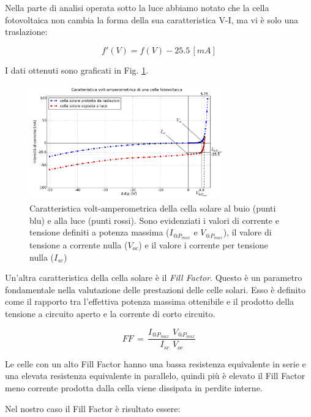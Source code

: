 Nella parte di analisi operata sotto la luce abbiamo notato che la cella fotovoltaica non cambia la forma della sua caratteristica V-I, ma vi è solo una traslazione: 

$$f'(V)=f(V)-25.5 \, [mA]$$ %
 

I dati ottenuti sono graficati in Fig. \ref{fig:cella}.

\begin{figure}[h]
\center
	\includegraphics[width=0.75\textwidth]{cella.pdf}
	\caption{Caratteristica volt-amperometrica della cella solare al buio (punti blu) e alla luce (punti rossi). Sono evidenziati i valori di corrente e tensione definiti a potenza massima ($I_{@P_{max}}$ e $V_{@P_{max}}$), il valore di tensione a corrente nulla ($V_{oc}$) e il valore i corrente per tensione nulla ($I_{sc}$)}
	\label{fig:cella}
\end{figure}

Un'altra caratteristica della cella solare è il \emph{Fill Factor}. Questo è un parametro fondamentale nella valutazione delle prestazioni delle celle solari. Esso è definito come il rapporto tra l'effettiva potenza massima ottenibile e il prodotto della tensione a circuito aperto e la corrente di corto circuito.

\begin{equation}
FF \, = \, \frac{I_{@P_{max}} \,\, V_{@P_{max}}}{I_{sc} \,\, V_{oc}}
\label{eq:FF}
\end{equation}

Le celle con un alto Fill Factor hanno una bassa resistenza equivalente in serie e una elevata resistenza equivalente in parallelo, quindi più è elevato il Fill Factor meno corrente prodotta dalla cella viene dissipata in perdite interne.

Nel nostro caso il Fill Factor è risultato essere:

